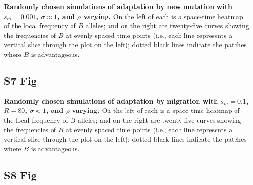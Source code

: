 \documentclass[10pt,letterpaper]{article}
\begin{document}
\textbf{Randomly chosen simulations of adaptation by new mutation
with $s_m=0.001$, $\sigma\approx 1$, and $\rho$ varying.}
    On the left of each is a space-time heatmap of the local frequency of $B$ alleles;
    and on the right are twenty-five curves showing the frequencies of $B$ at evenly spaced time points
    (i.e., each line represents a vertical slice through the plot on the left);
    dotted black lines indicate the patches where $B$ is advantageous.


\subsection*{S7 Fig}
\label{sfig:sims_5}

\textbf{Randomly chosen simulations of adaptation by migration
with $s_m=0.1$, $R=80$, $\sigma\approx 1$, and $\rho$ varying.}
    On the left of each is a space-time heatmap of the local frequency of $B$ alleles;
    and on the right are twenty-five curves showing the frequencies of $B$ at evenly spaced time points
    (i.e., each line represents a vertical slice through the plot on the left);
    dotted black lines indicate the patches where $B$ is advantageous.


\subsection*{S8 Fig}
\label{sfig:sims_6}
\end{document}
